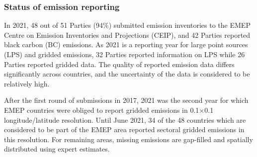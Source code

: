 



\subsubsection*{Status of emission reporting}
In 2021, 48 out of 51 Parties (94$\%$) submitted emission inventories to the EMEP Centre on Emission Inventories and Projections (CEIP), and 42 Parties reported black carbon (BC) emissions. As 2021 is a reporting year for large point sources (LPS) and gridded emissions, 32 Parties reported information on LPS while 26 Parties reported gridded data. The quality of reported emission data differs significantly across countries, and the uncertainty of the data is considered to be relatively high.

After the first round of submissions in 2017, 2021 was the second year for which EMEP countries were obliged to report gridded emissions in  0.1{\degrees}$\times$0.1{\degrees} lon\-gi\-tude/la\-ti\-tude resolution. Until June 2021, 34 of the 48 countries which are considered to be part of the EMEP area reported sectoral gridded emissions in this resolution. For remaining areas, missing emissions are gap-filled and spatially distributed using expert estimates.

